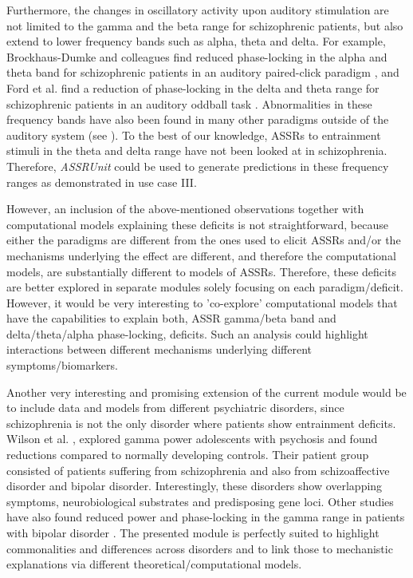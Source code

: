\documentclass[CompPsych]{stjour}
\begin{document}
Furthermore, the changes in oscillatory activity upon auditory stimulation are not limited to the gamma and the beta range for schizophrenic patients, but also extend to lower frequency bands such as alpha, theta and delta.
For example, Brockhaus-Dumke and colleagues find reduced phase-locking in the alpha and theta band for schizophrenic patients in an auditory paired-click paradigm \cite{Brockhaus2008}, and Ford et al. find a
reduction of phase-locking in the delta and theta range for schizophrenic patients in an auditory oddball task \cite{Ford2008}. Abnormalities in these frequency bands have also been found in many other paradigms outside of
the auditory system (see \cite{Basar2013}). To the best of our knowledge, ASSRs to entrainment stimuli in the theta and delta range have not been looked at in schizophrenia. Therefore, \textit{ASSRUnit} could be 
used to generate predictions in these frequency ranges as demonstrated in use case III.

However, an inclusion of the above-mentioned observations together with computational models explaining these deficits is not straightforward, because either the paradigms are different from the ones
used to elicit ASSRs and/or the mechanisms underlying the effect are different, and therefore the computational models, are substantially different to models of ASSRs. Therefore, these deficits are better explored in separate modules solely focusing
on each paradigm/deficit. However, it would be very interesting to 'co-explore' computational models that have the capabilities to explain both, ASSR gamma/beta band and delta/theta/alpha phase-locking, deficits. Such an analysis 
could highlight interactions between different mechanisms underlying different symptoms/biomarkers.

Another very interesting and promising extension of the current module would be to include data and models from different psychiatric disorders, since schizophrenia is not the only disorder
where patients show entrainment deficits. Wilson et al. \cite{Wilson2007}, explored gamma power adolescents with psychosis and found reductions compared to normally developing controls. Their patient group
consisted of patients suffering from schizophrenia and also from schizoaffective disorder and bipolar disorder. Interestingly, these disorders show overlapping symptoms, neurobiological substrates and predisposing gene loci. 
Other studies have also found reduced power and phase-locking in the gamma range in patients 
with bipolar disorder \cite{ODonnell2004,Spencer2008,Rass2010}.
The presented module is perfectly suited to highlight commonalities and differences across disorders and to link those to mechanistic 
explanations via different theoretical/computational models.
\end{document}
